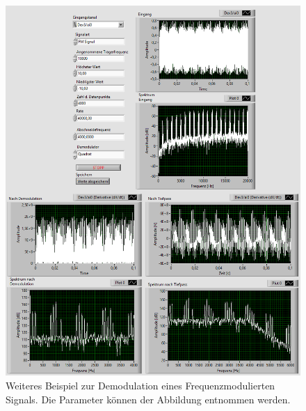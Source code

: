 \begin{figure}[H]
	\centering
	\includegraphics[width=1\textwidth]{pic/FM10k1k1.png}
	\caption{Weiteres Beispiel zur Demodulation eines Frequenzmodulierten Signals. Die Parameter können der Abbildung entnommen werden.}
	\label{fig:a14}	
\end{figure} 


